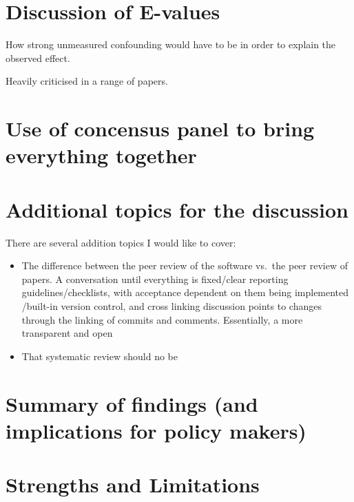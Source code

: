 \documentclass[a4paper, twoside]{templates/ociamthesis}
\begin{document}
\hypertarget{discussion-of-e-values}{%
\section{Discussion of E-values}\label{discussion-of-e-values}}

How strong unmeasured confounding would have to be in order to explain the observed effect.

Heavily criticised in a range of papers.

\hypertarget{use-of-concensus-panel-to-bring-everything-together}{%
\section{Use of concensus panel to bring everything together}\label{use-of-concensus-panel-to-bring-everything-together}}

\hypertarget{additional-topics-for-the-discussion}{%
\section{Additional topics for the discussion}\label{additional-topics-for-the-discussion}}

There are several addition topics I would like to cover:

\begin{itemize}
\item
  The difference between the peer review of the software vs.~the peer review of papers. A conversation until everything is fixed/clear reporting guidelines/checklists, with acceptance dependent on them being implemented /built-in version control, and cross linking discussion points to changes through the linking of commits and comments. Essentially, a more transparent and open
\item
  That systematic review should no be
\end{itemize}

\hypertarget{summary-of-findings-and-implications-for-policy-makers}{%
\section{Summary of findings (and implications for policy makers)}\label{summary-of-findings-and-implications-for-policy-makers}}

\hypertarget{strengths-and-limitations-1}{%
\section{Strengths and Limitations}\label{strengths-and-limitations-1}}
\end{document}
